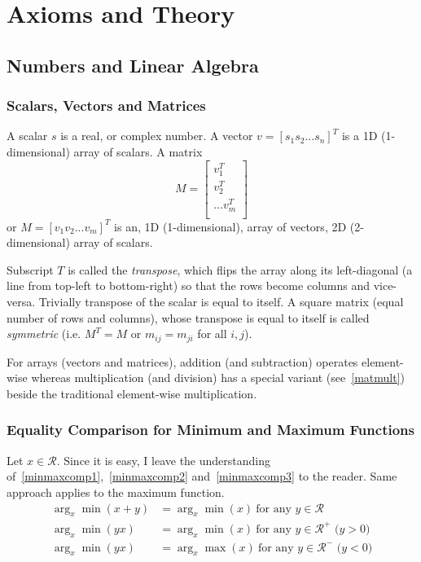 \documentclass{book}
\numberwithin{equation}{subsection}
\begin{document}
\section{Axioms and Theory}
\subsection{Numbers and Linear Algebra}
\subsubsection{Scalars, Vectors and Matrices}
\label{defn_svm}
A scalar $s$ is a real, or complex number. A vector $v = [s_1 s_2 ... s_n]^T$ is a 1D (1-dimensional) array of scalars. 
A matrix 
$$
M = \begin{bmatrix}
    v_1^T\\
    v_2^T\\
    ...
    v_m^T\\
\end{bmatrix}
$$
or $M = [v_1 v_2 ... v_m]^T$
is an, 1D (1-dimensional), array of vectors, 2D (2-dimensional) array of scalars. 

Subscript $T$ is called the \textit{transpose}, which flips the array along its left-diagonal (a line from top-left to bottom-right) so that the rows become columns and vice-versa. Trivially transpose of the scalar is equal to itself. A square matrix (equal number of rows and columns), whose transpose is equal to itself is called \textit{symmetric} (i.e. $M^T=M$ or $m_{ij} = m_{ji}$ for all $i, j$). 

For arrays (vectors and matrices), addition (and subtraction) operates element-wise whereas multiplication (and division) has a special variant (see~\ref{matmult}) beside the traditional element-wise multiplication.
\subsubsection{Equality Comparison for Minimum and Maximum Functions}
Let $x \in \mathcal{R}$. Since it is easy, I leave the understanding of~\ref{minmaxcomp1},~\ref{minmaxcomp2} and~\ref{minmaxcomp3} to the reader. Same approach applies to the maximum function.
\begin{align}
    \arg_x\min(x+y) &= \arg_x\min(x)\ \text{for any $y \in \mathcal{R}$}\label{minmaxcomp1}\\
     \arg_x\min(yx) &= \arg_x\min(x)\ \text{for any $y \in \mathcal{R^+}$ ($y>0$)}\label{minmaxcomp2}\\
     \arg_x\min(yx) &= \arg_x\max(x)\ \text{for any $y \in \mathcal{R^-}$ ($y<0$)}\label{minmaxcomp3}
\end{align}
\end{document}
